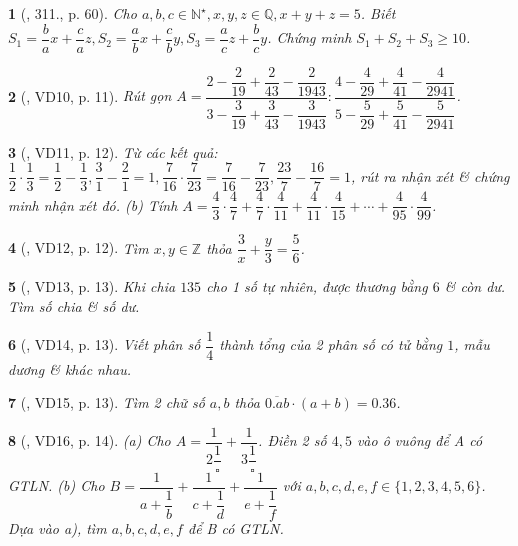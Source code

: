 \documentclass{article}
\newtheorem{baitoan}{}
\begin{document}
\begin{baitoan}[\cite{Tuyen_Toan_6}, 311., p. 60]
	Cho $a,b,c\in\mathbb{N}^\star,x,y,z\in\mathbb{Q},x + y + z = 5$. Biết $S_1 = \dfrac{b}{a}x + \dfrac{c}{a}z,S_2 = \dfrac{a}{b}x + \dfrac{c}{b}y,S_3 = \dfrac{a}{c}z + \dfrac{b}{c}y$. Chứng minh $S_1 + S_2 + S_3\ge10$.
\end{baitoan}

\begin{baitoan}[\cite{Binh_Toan_6_tap_2}, VD10, p. 11]
	Rút gọn $A = \dfrac{2 - \dfrac{2}{19} + \dfrac{2}{43} - \dfrac{2}{1943}}{3 - \dfrac{3}{19} + \dfrac{3}{43} - \dfrac{3}{1943}}:\dfrac{4 - \dfrac{4}{29} + \dfrac{4}{41} - \dfrac{4}{2941}}{5 - \dfrac{5}{29} + \dfrac{5}{41} - \dfrac{5}{2941}}$.
\end{baitoan}

\begin{baitoan}[\cite{Binh_Toan_6_tap_2}, VD11, p. 12]
	Từ các kết quả: $\dfrac{1}{2}\cdot\dfrac{1}{3} = \dfrac{1}{2} - \dfrac{1}{3},\dfrac{3}{1} - \dfrac{2}{1} = 1,\dfrac{7}{16}\cdot\dfrac{7}{23} = \dfrac{7}{16} - \dfrac{7}{23},\dfrac{23}{7} - \dfrac{16}{7} = 1$, rút ra nhận xét \& chứng minh nhận xét đó. (b) Tính $A = \dfrac{4}{3}\cdot\dfrac{4}{7} + \dfrac{4}{7}\cdot\dfrac{4}{11} +  \dfrac{4}{11}\cdot\dfrac{4}{15} + \cdots + \dfrac{4}{95}\cdot\dfrac{4}{99}$.
\end{baitoan}

\begin{baitoan}[\cite{Binh_Toan_6_tap_2}, VD12, p. 12]
	Tìm $x,y\in\mathbb{Z}$ thỏa $\dfrac{3}{x} + \dfrac{y}{3} = \dfrac{5}{6}$.
\end{baitoan}

\begin{baitoan}[\cite{Binh_Toan_6_tap_2}, VD13, p. 13]
	Khi chia $135$ cho 1 số tự nhiên, được thương bằng $6$ \& còn dư. Tìm số chia \& số dư.
\end{baitoan}

\begin{baitoan}[\cite{Binh_Toan_6_tap_2}, VD14, p. 13]
	Viết phân số $\dfrac{1}{4}$ thành tổng của 2 phân số có tử bằng $1$, mẫu dương \& khác nhau.
\end{baitoan}

\begin{baitoan}[\cite{Binh_Toan_6_tap_2}, VD15, p. 13]
	Tìm 2 chữ số $a,b$ thỏa $\overline{0.ab}\cdot(a + b) = 0.36$.
\end{baitoan}

\begin{baitoan}[\cite{Binh_Toan_6_tap_2}, VD16, p. 14]
	(a) Cho $A = \dfrac{1}{2\dfrac{1}{\square}} + \dfrac{1}{3\dfrac{1}{\square}}$. Điền 2 số $4,5$ vào ô vuông để A có {\rm GTLN}. (b) Cho $B = \dfrac{1}{a + \dfrac{1}{b}} + \dfrac{1}{c + \dfrac{1}{d}} + \dfrac{1}{e + \dfrac{1}{f}}$ với $a,b,c,d,e,f\in\{1,2,3,4,5,6\}$. Dựa vào a), tìm $a,b,c,d,e,f$ để B có {\rm GTLN}.
\end{baitoan}
\end{document}
